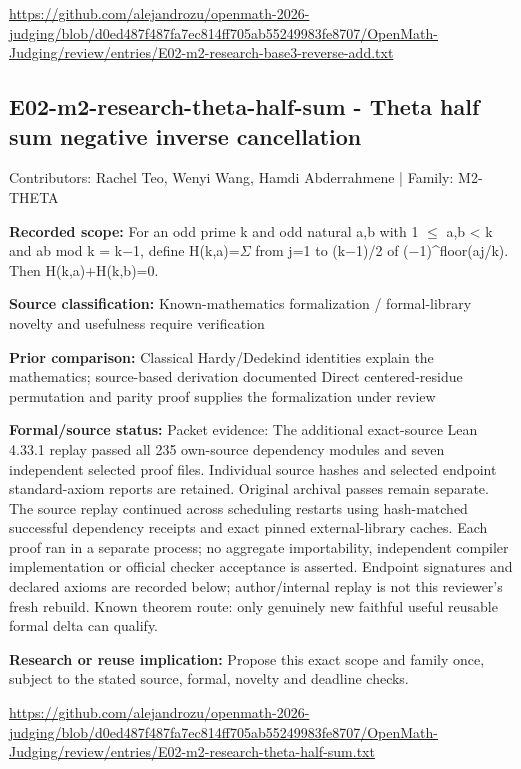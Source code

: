 \documentclass[11pt,a4paper]{article}
\begin{document}
{\small \url{https://github.com/alejandrozu/openmath-2026-judging/blob/d0ed487f487fa7ec814ff705ab55249983fe8707/OpenMath-Judging/review/entries/E02-m2-research-base3-reverse-add.txt}\par}

\begin{samepage}
\subsection{E02-m2-research-theta-half-sum  -  Theta half sum negative inverse cancellation}
{\small Contributors: Rachel Teo, Wenyi Wang, Hamdi Abderrahmene | Family: M2-THETA\par}

\textbf{Recorded scope:} For an odd prime k and odd natural a,b with 1 \ensuremath{\leq} a,b < k and ab mod k = k\ensuremath{-}1, define H(k,a)=\ensuremath{\Sigma} from j=1 to (k\ensuremath{-}1)/2 of (\ensuremath{-}1)\textasciicircum{}floor(aj/k). Then H(k,a)+H(k,b)=0.

\end{samepage}
\textbf{Source classification:} Known-mathematics formalization / formal-library novelty and usefulness require verification

\textbf{Prior comparison:} Classical Hardy/Dedekind identities explain the mathematics; source-based derivation documented Direct centered-residue permutation and parity proof supplies the formalization under review

\textbf{Formal/source status:} Packet evidence: The additional exact-source Lean 4.33.1 replay passed all 235 own-source dependency modules and seven independent selected proof files. Individual source hashes and selected endpoint standard-axiom reports are retained. Original archival passes remain separate. The source replay continued across scheduling restarts using hash-matched successful dependency receipts and exact pinned external-library caches. Each proof ran in a separate process; no aggregate importability, independent compiler implementation or official checker acceptance is asserted. Endpoint signatures and declared axioms are recorded below; author/internal replay is not this reviewer's fresh rebuild. Known theorem route: only genuinely new faithful useful reusable formal delta can qualify.

\textbf{Research or reuse implication:} Propose this exact scope and family once, subject to the stated source, formal, novelty and deadline checks.

{\small \url{https://github.com/alejandrozu/openmath-2026-judging/blob/d0ed487f487fa7ec814ff705ab55249983fe8707/OpenMath-Judging/review/entries/E02-m2-research-theta-half-sum.txt}\par}
\end{document}
